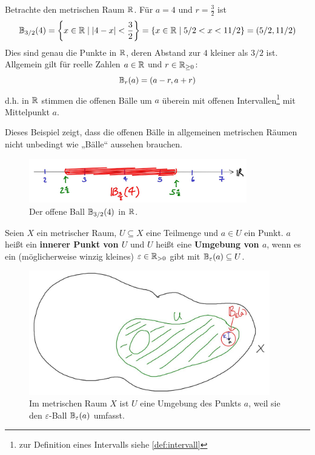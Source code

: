 \begin{bsp}
    Betrachte den metrischen Raum $\mathbb R$. Für $a=4$ und $r= \frac{3}{2}$ ist
        \[ \mathbb B_{3/2}(4) = \left\{ x\in \mathbb R\mid \vert 4-x\vert <\frac{3}{2} \right\} = \left\{ x\in \mathbb R\mid 5/2<x<11/2 \right\} = \left(5/2,11/2\right) \]
    Dies sind genau die Punkte in $\mathbb R$, deren Abstand zur $4$ kleiner als $3/2$ ist. Allgemein gilt für reelle Zahlen $a\in \mathbb R$ und $r\in \mathbb R_{\ge 0}$:
        \[ \mathbb B_r(a) = (a-r,a+r) \]
    d.h. in $\mathbb R$ stimmen die offenen Bälle um $a$ überein mit offenen Intervallen\footnote{zur Definition eines Intervalls siehe \cref{def:intervall}} mit Mittelpunkt $a$.
    
    Dieses Beispiel zeigt, dass die offenen Bälle in allgemeinen metrischen Räumen nicht unbedingt wie „Bälle“ aussehen brauchen.
    \begin{figure}[ht]
        \includegraphics[width=9.5cm]{./_img/1Dball.jpeg}
        \centering \caption{Der offene Ball $\mathbb B_{3/2}(4)$ in $\mathbb R$.}
    \end{figure}
\end{bsp}


\begin{de} \label{def:umgebung}  
    Seien $X$ ein metrischer Raum, $U\subseteq X$ eine Teilmenge und $a\in U$ ein Punkt. $a$ heißt ein \textbf{innerer Punkt von $U$} und $U$ heißt eine \textbf{Umgebung von $a$}, wenn es ein (möglicherweise winzig kleines) $\varepsilon\in \mathbb R_{>0}$ gibt mit $\mathbb B_\varepsilon(a)\subseteq U$.
    \begin{figure}[ht!]
        \includegraphics[width=10.5cm]{./_img/Umgebung.jpeg}
        \centering \caption{Im metrischen Raum $X$ ist $U$ eine Umgebung des Punkts $a$, weil sie den $\varepsilon$-Ball $\mathbb B_\varepsilon(a)$ umfasst.}
    \end{figure}
\end{de}


